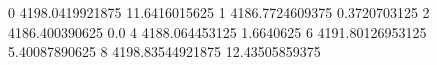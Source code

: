 0 4198.0419921875 11.6416015625
1 4186.7724609375 0.3720703125
2 4186.400390625 0.0
4 4188.064453125 1.6640625
6 4191.80126953125 5.40087890625
8 4198.83544921875 12.43505859375
